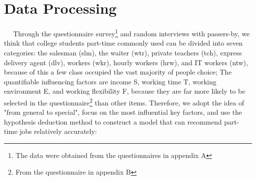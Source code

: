 \documentclass[12pt]{article}
\begin{document}
\section{Data Processing}
~~
Through the questionnaire survey\footnote[1]{The data were obtained from the questionnaires in appendix A} and random interviews with passers-by, we think that college students part-time commonly used can be divided into seven categories: the salesman (slm), the waiter (wtr), private teachers (tch), express delivery agent (dlv), workers (wkr), hourly workers (hrw), and IT workers (ntw), because of this a few class occupied the vast majority of people choice; The quantifiable influencing factors are income S, working time T, working environment E, and working flexibility F, because they are far more likely to be selected in the questionnaire\footnote[1]{From the questionnaire in appendix B} than other items. Therefore, we adopt the idea of "from general to special", focus on the most influential key factors, and use the hypothesis deduction method to construct a model that can recommend part-time jobs relatively accurately:
\end{document}
